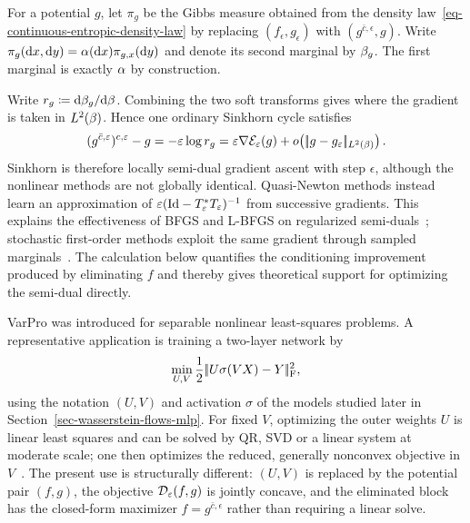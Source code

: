 For a potential $g$, let $\pi_g$ be the Gibbs measure obtained from the density law~\eqref{eq-continuous-entropic-density-law} by replacing $(f_\epsilon,g_\epsilon)$ with $(g^{\bar c,\epsilon},g)$. Write
\(
	\pi_g(\mathrm{d} x,\mathrm{d} y)=\alpha(\mathrm{d} x)\pi_{g,x}(\mathrm{d} y)
\)
and denote its second marginal by $\beta_g$. The first marginal is exactly $\alpha$ by construction.

\begin{rem}\label{rem-sinkhorn-semidual-gradient}
	Write $r_g\coloneqq\mathrm{d}\beta_g/\mathrm{d}\beta$. Combining the two soft transforms gives
	where the gradient is taken in $L^2(\beta)$. Hence one ordinary Sinkhorn cycle satisfies
	\[
		(g^{\bar c,\varepsilon})^{c,\varepsilon}-g
		=
		-\varepsilon\log r_g
		=
		\varepsilon\nabla\mathcal{E}_\varepsilon(g)
		+o\!\left(|\!| g-g_\varepsilon |\!|_{L^2(\beta)}\right).
	\]
	Sinkhorn is therefore locally semi-dual gradient ascent with step $\epsilon$, although the nonlinear methods are not globally identical. Quasi-Newton methods instead learn an approximation of $\varepsilon(\mathrm{Id}-T_\varepsilon^*T_\varepsilon)^{-1}$ from successive gradients. This explains the effectiveness of BFGS and L-BFGS on regularized semi-duals~\cite{2016-Cuturi-siims,cuturi2018semidual,nocedal}; stochastic first-order methods exploit the same gradient through sampled marginals~\cite{genevay2016stochastic}. The calculation below quantifies the conditioning improvement produced by eliminating $f$ and thereby gives theoretical support for optimizing the semi-dual directly.
\end{rem}

VarPro was introduced for separable nonlinear least-squares problems. A representative application is training a two-layer network by
\[
	\min_{U,V}\frac12|\!| U\sigma(VX)-Y |\!|_{\rm F}^2,
\]
using the notation $(U,V)$ and activation $\sigma$ of the models studied later in Section~\ref{sec-wasserstein-flows-mlp}. For fixed $V$, optimizing the outer weights $U$ is linear least squares and can be solved by QR, SVD or a linear system at moderate scale; one then optimizes the reduced, generally nonconvex objective in $V$~\cite{kim2008variableprojection}. The present use is structurally different: $(U,V)$ is replaced by the potential pair $(f,g)$, the objective $\mathcal{D}_\varepsilon(f,g)$ is jointly concave, and the eliminated block has the closed-form maximizer $f=g^{\bar c,\epsilon}$ rather than requiring a linear solve.

